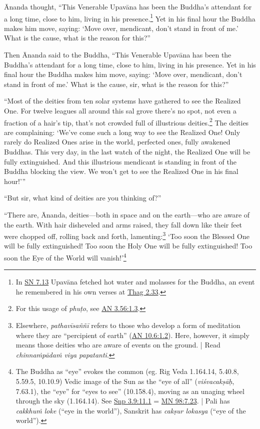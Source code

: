 \documentclass[12pt,openany]{book}%
\begin{document}
Ānanda thought, “This Venerable \textsanskrit{Upavāna} has been the Buddha’s attendant for a long time, close to him, living in his presence.\footnote{In \href{https://suttacentral.net/sn7.13/en/sujato}{SN 7.13} \textsanskrit{Upavāna} fetched hot water and molasses for the Buddha, an event he remembered in his own verses at \href{https://suttacentral.net/thag2.33/en/sujato}{Thag 2.33}. } Yet in his final hour the Buddha makes him move, saying: ‘Move over, mendicant, don’t stand in front of me.’ What is the cause, what is the reason for this?” 

Then Ānanda said to the Buddha, “This Venerable \textsanskrit{Upavāna} has been the Buddha’s attendant for a long time, close to him, living in his presence. Yet in his final hour the Buddha makes him move, saying: ‘Move over, mendicant, don’t stand in front of me.’ What is the cause, sir, what is the reason for this?” 

“Most of the deities from ten solar systems have gathered to see the Realized One. For twelve leagues all around this sal grove there’s no spot, not even a fraction of a hair’s tip, that’s not crowded full of illustrious deities.\footnote{For this usage of \textit{\textsanskrit{phuṭo}}, see \href{https://suttacentral.net/an3.56/en/sujato\#1.3}{AN 3.56:1.3}. } The deities are complaining: ‘We’ve come such a long way to see the Realized One! Only rarely do Realized Ones arise in the world, perfected ones, fully awakened Buddhas. This very day, in the last watch of the night, the Realized One will be fully extinguished. And this illustrious mendicant is standing in front of the Buddha blocking the view. We won’t get to see the Realized One in his final hour!’” 

“But sir, what kind of deities are you thinking of?” 

“There are, Ānanda, deities—both in space and on the earth—who are aware of the earth. With hair disheveled and arms raised, they fall down like their feet were chopped off, rolling back and forth, lamenting:\footnote{Elsewhere, \textit{\textsanskrit{pathavīsaññī}} refers to those who develop a form of meditation where they are “percipient of earth” (\href{https://suttacentral.net/an10.6/en/sujato\#1.2}{AN 10.6:1.2}). Here, however, it simply means those deities who are aware of events on the ground. | Read \textit{\textsanskrit{chinnaṁpādaṁ} viya papatanti}. } ‘Too soon the Blessed One will be fully extinguished! Too soon the Holy One will be fully extinguished! Too soon the Eye of the World will vanish!’\footnote{The Buddha as “eye” evokes the common (eg. Rig Veda 1.164.14, 5.40.8, 5.59.5, 10.10.9) Vedic image of the Sun as the “eye of all” (\textit{\textsanskrit{viśvacakṣāḥ}}, 7.63.1), the “eye” for “eyes to see” (10.158.4), moving as an unaging wheel through the sky (1.164.14). See \href{https://suttacentral.net/snp3.9/en/sujato\#11.1}{Snp 3.9:11.1} = \href{https://suttacentral.net/mn98/en/sujato\#7.23}{MN 98:7.23}. | Pali has \textit{\textsanskrit{cakkhuṁ} loke} (“eye in the world”), Sanskrit has \textit{\textsanskrit{cakṣur} lokasya} (“eye of the world”). } 
\end{document}
